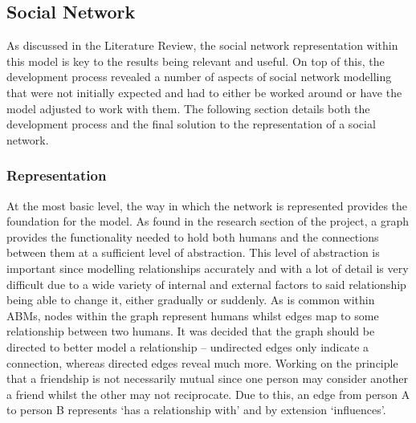 \documentclass[]{report}
\begin{document}
\subsection{Social Network}
As discussed in the Literature Review, the social network representation within this model is key to the results being relevant and useful. On top of this, the development process revealed a number of aspects of social network modelling that were not initially expected and had to either be worked around or have the model adjusted to work with them. The following section details both the development process and the final solution to the representation of a social network.

\subsubsection{Representation}
At the most basic level, the way in which the network is represented provides the foundation for the model. As found in the research section of the project, a graph provides the functionality needed to hold both humans and the connections between them at a sufficient level of abstraction. This level of abstraction is important since modelling relationships accurately and with a lot of detail is very difficult due to a wide variety of internal and external factors to said relationship being able to change it, either gradually or suddenly. As is common within ABMs, nodes within the graph represent humans whilst edges map to some relationship between two humans.
It was decided that the graph should be directed to better model a relationship – undirected edges only indicate a connection, whereas directed edges reveal much more. Working on the principle that a friendship is not necessarily mutual since one person may consider another a friend whilst the other may not reciprocate. Due to this, an edge from person A to person B represents `has a relationship with' and by extension `influences'.
\end{document}
